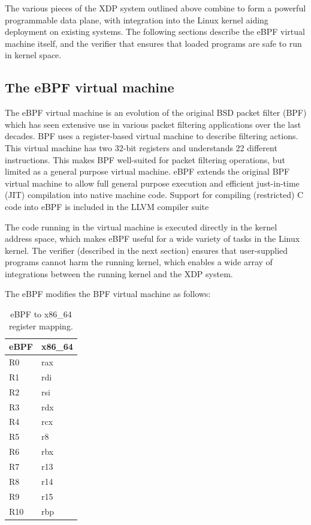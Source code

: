 \documentclass[10pt]{sig-alternate-05-2015}
\begin{document}
The various pieces of the XDP system outlined above combine to form a powerful
programmable data plane, with integration into the Linux kernel aiding
deployment on existing systems. The following sections describe the eBPF virtual
machine itself, and the verifier that ensures that loaded programs are safe to
run in kernel space.

\subsection{The eBPF virtual machine}
\label{sec:bpf-vm}
The eBPF virtual machine is an evolution of the original BSD packet filter (BPF)
\cite{mccanne_bsd_1993} which has seen extensive use in various packet filtering
applications over the last decades. BPF uses a register-based virtual machine to
describe filtering actions. This virtual machine has two 32-bit registers and
understands 22 different instructions. This makes BPF well-suited for packet
filtering operations, but limited as a general purpose virtual machine. eBPF
extends the original BPF virtual machine to allow full general purpose execution
and efficient just-in-time (JIT) compilation into native machine code. Support
for compiling (restricted) C code into eBPF is included in the LLVM compiler
suite

The code running in the virtual machine is executed directly in the kernel
address space, which makes eBPF useful for a wide variety of tasks in the Linux
kernel. The verifier (described in the next section) ensures that user-supplied
programs cannot harm the running kernel, which enables a wide array of
integrations between the running kernel and the XDP system.

The eBPF modifies the BPF virtual machine as follows:

\begin{table}[htbp]
\caption{\label{tbl:reg-map}
eBPF to x86\_64 register mapping.}
\centering
\begin{tabular}{ll}
\toprule
eBPF & x86\_64\\
\midrule
R0 & rax\\
R1 & rdi\\
R2 & rsi\\
R3 & rdx\\
R4 & rcx\\
R5 & r8\\
R6 & rbx\\
R7 & r13\\
R8 & r14\\
R9 & r15\\
R10 & rbp\\
\bottomrule
\end{tabular}
\end{table}
\end{document}
